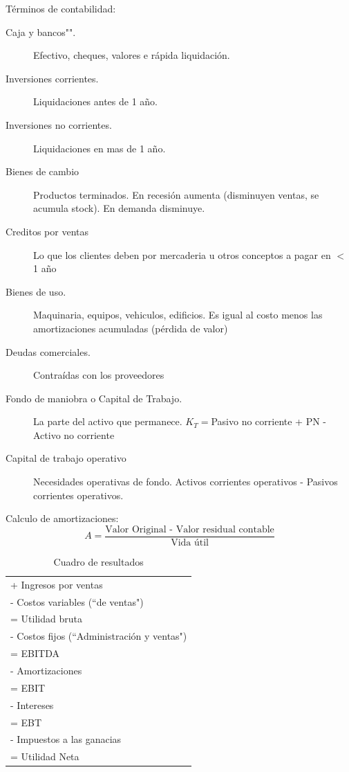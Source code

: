 \documentclass[twocolumn,10pt]{article}
\begin{document}
Términos de contabilidad:
\begin{description}
	\item[Caja y bancos"".] Efectivo, cheques, valores e rápida liquidación.
	\item[Inversiones corrientes.] Liquidaciones antes de 1 año.
	\item[Inversiones no corrientes.] Liquidaciones en mas de 1 año.
	\item[Bienes de cambio] Productos terminados. En recesión aumenta (disminuyen ventas, se acumula stock). En demanda disminuye.
	\item[Creditos por ventas] Lo que los clientes deben por mercaderia u otros conceptos a pagar en $<$ 1 año
	\item[Bienes de uso.] Maquinaria, equipos, vehiculos, edificios. Es igual al costo menos las amortizaciones acumuladas (pérdida de valor)
	\item[Deudas comerciales.] Contraídas con los proveedores
	\item[Fondo de maniobra o Capital de Trabajo.] La parte del activo que permanece. $K_T=$Pasivo no corriente + PN - Activo no corriente
	\item[Capital de trabajo operativo]  Necesidades operativas de fondo. Activos corrientes operativos - Pasivos corrientes operativos.
\end{description}

Calculo de amortizaciones:
\[
A = \frac{\text{Valor Original - Valor residual contable}}{\text{Vida útil}}
\]

\begin{table}[h]
	\centering
	\begin{tabular}{|l|} \hline
		+ Ingresos por ventas \\
		- Costos variables (``de ventas") \\ \hline
		= Utilidad bruta \\
		- Costos fijos (``Administración y ventas") \\ \hline
		= EBITDA \\
		- Amortizaciones \\ \hline
		= EBIT \\
		- Intereses \\ \hline
		= EBT \\
		- Impuestos a las ganacias
		\\ \hline
		= Utilidad Neta\\ \hline
	\end{tabular}
\caption{Cuadro de resultados}
\end{table}
\end{document}
